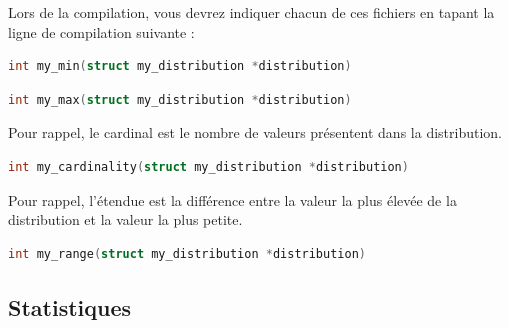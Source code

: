 \documentclass[11pt,a4paper]{article}
\begin{document}
\medskip

Lors de la compilation, vous devrez indiquer chacun de ces fichiers en tapant la ligne de compilation suivante :

\medskip


\bigskip


\begin{lstlisting}[language=C,morekeywords={floor,ceil}]
int my_min(struct my_distribution *distribution) \end{lstlisting}



\begin{lstlisting}[language=C,morekeywords={floor,ceil}]
int my_max(struct my_distribution *distribution) \end{lstlisting}



Pour rappel, le cardinal est le nombre de valeurs présentent dans la distribution.

\medskip

\begin{lstlisting}[language=C,morekeywords={floor,ceil}]
int my_cardinality(struct my_distribution *distribution) \end{lstlisting}



Pour rappel, l'étendue est la différence entre la valeur la plus élevée de la distribution et la valeur la plus petite.

\medskip

\begin{lstlisting}[language=C,morekeywords={floor,ceil}]
int my_range(struct my_distribution *distribution) \end{lstlisting}


\newpage


\subsection{Statistiques}
\end{document}
